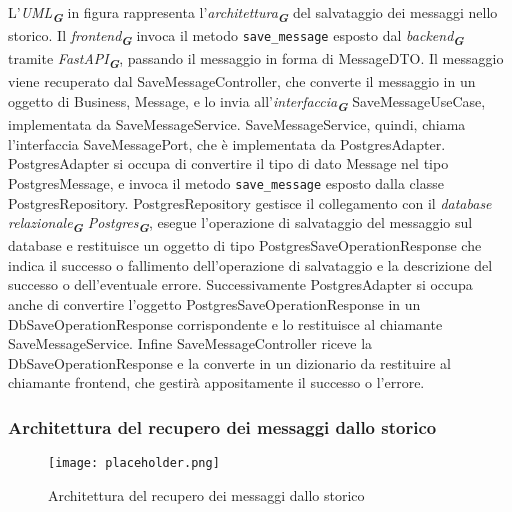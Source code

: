 L'\emph{UML}\textsubscript{\textbf{\textit{G}}} in figura rappresenta l'\emph{architettura}\textsubscript{\textbf{\textit{G}}} del salvataggio dei messaggi nello storico.
Il \emph{frontend}\textsubscript{\textbf{\textit{G}}} invoca il metodo \texttt{save\_message} esposto dal \emph{backend}\textsubscript{\textbf{\textit{G}}} tramite \emph{FastAPI}\textsubscript{\textbf{\textit{G}}}, passando il messaggio in forma di MessageDTO.
Il messaggio viene recuperato dal SaveMessageController, che converte il messaggio in un oggetto di Business, Message, e lo invia all'\emph{interfaccia}\textsubscript{\textbf{\textit{G}}} SaveMessageUseCase, implementata da SaveMessageService.
SaveMessageService, quindi, chiama l'interfaccia SaveMessagePort, che è implementata da PostgresAdapter.
PostgresAdapter si occupa di convertire il tipo di dato Message nel tipo PostgresMessage, e invoca il metodo \texttt{save\_message} esposto dalla classe PostgresRepository.
PostgresRepository gestisce il collegamento con il \emph{database relazionale}\textsubscript{\textbf{\textit{G}}} \emph{Postgres}\textsubscript{\textbf{\textit{G}}},
esegue l'operazione di salvataggio del messaggio sul database e restituisce un oggetto di tipo PostgresSaveOperationResponse che indica il successo o fallimento dell'operazione di salvataggio e la descrizione del successo o dell'eventuale errore.
Successivamente PostgresAdapter si occupa anche di convertire l'oggetto PostgresSaveOperationResponse in un DbSaveOperationResponse corrispondente e lo restituisce al chiamante SaveMessageService.
Infine SaveMessageController riceve la DbSaveOperationResponse e la converte in un dizionario da restituire al chiamante frontend, che gestirà appositamente il successo o l'errore.

\newpage


\subsubsection{Architettura del recupero dei messaggi dallo storico}
\label{sec:architettura_recupero_messaggi_storico}

\begin{figure}[h]
    \centering
    \texttt{[image: placeholder.png]}
    \caption{Architettura del recupero dei messaggi dallo storico}
\end{figure}

